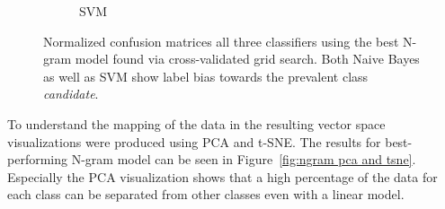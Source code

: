 \begin{figure}
\begin{subfigure}[b]{0.35\textwidth}
        \caption{SVM}
\label{fig:ngram-conf-matrix-svm-normalized}
    \end{subfigure}
    \caption{Normalized confusion matrices all three classifiers using the best N-gram model found via cross-validated grid search. Both Naive Bayes as well as SVM show label bias towards the prevalent class \emph{candidate}.}
\label{fig:ngram-conf-matrix}
\end{figure}

To understand the mapping of the data in the resulting vector space visualizations were produced using \gls{PCA} and \gls{t-SNE}. The results for best-performing N-gram model can be seen in Figure~\ref{fig:ngram pca and tsne}. Especially the \gls{PCA} visualization shows that a high percentage of the data for each class can be separated from other classes even with a linear model.

